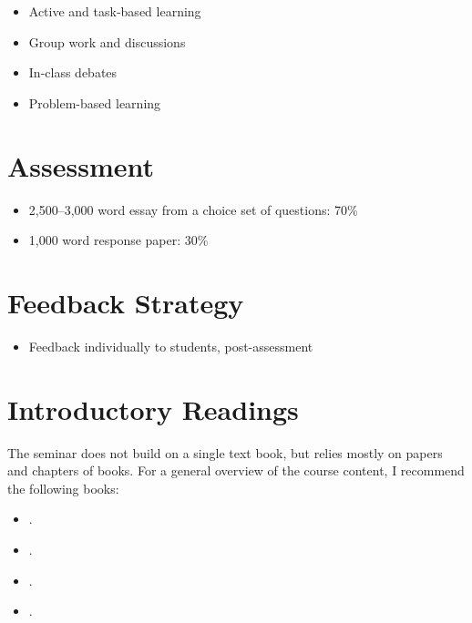 \documentclass[abstract=on,parskip=full,headings=standardclasses,fontsize=11pt,paper=a4]{scrartcl}
\begin{document}
\begin{itemize}
\item Active and task-based learning
\item Group work and discussions
\item In-class debates
\item Problem-based learning
\end{itemize}

\section*{Assessment}

\begin{itemize}
\item 2,500--3,000 word essay from a choice set of questions: 70\%
\item 1,000 word response paper: 30\% 
\end{itemize}

\section*{Feedback Strategy}

\begin{itemize}
\item Feedback individually to students, post-assessment
\end{itemize}

\section*{Introductory Readings}

The seminar does not build on a single text book, but relies mostly on papers and chapters of books. For  a general overview of the course content, I recommend the following books:

\begin{itemize}
\item {}.
\item {}.
\item {}.
\item {}.
\end{itemize}
\end{document}
